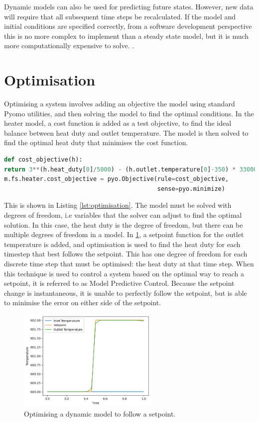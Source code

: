 \documentclass[12pt]{article}
\begin{document}
Dynamic models can also be used for predicting future states. However, new data will require that all subsequent time steps be recalculated. 
If the model and initial conditions are specified correctly, from a software development perspective this is no more complex to implement than a steady state model, but it is much more computationally expensive to solve. 
.

\section{Optimisation}
Optimising a system involves adding an objective the model using standard Pyomo utilities, and then solving the model to find the optimal conditions. In the heater model, a cost function is added as a test objective, to find the ideal balance between heat duty and outlet temperature. The model is then solved to find the optimal heat duty that minimises the cost function.

\begin{lstlisting}[language=Python,caption=Optimising the heater model in IDAES,label=lst:optimisation]
def cost_objective(h):
return 3**(h.heat_duty[0]/5000) - (h.outlet.temperature[0]-350) * 33000
m.fs.heater.cost_objective = pyo.Objective(rule=cost_objective, 
                                           sense=pyo.minimize)
\end{lstlisting}

This is shown in Listing \ref{lst:optimisation}. The model must be solved with degrees of freedom, i.e variables that the solver can adjust to find the optimal solution. In this case, the heat duty is the degree of freedom, but there can be multiple degrees of freedom in a model. 
In \cref{fig:optimisation_dynamics}, a setpoint function for the outlet temperature is added, and optimisation is used to find the heat duty for each timestep that best follows the setpoint. This has one degree of freedom for each discrete time step that must be optimised: the heat duty at that time step. 
When this technique is used to control a system based on the optimal way to reach a setpoint, it is referred to as Model Predictive Control.
Because the setpoint change is instantaneous, it is unable to perfectly follow the setpoint, but is able to minimise the error on either side of the setpoint. 


\begin{figure}[h]
    \centering
    \includegraphics[width=0.6\textwidth]{dynamics_optimisation.png}
    \caption{Optimising a dynamic model to follow a setpoint.}
    \label{fig:optimisation_dynamics}
\end{figure}
\end{document}
